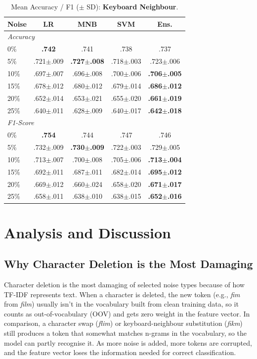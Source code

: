 \documentclass[sigconf]{acmart}
\begin{document}
\begin{table}
  \centering
  \caption{Mean Accuracy / F1 ($\pm$ SD): \textbf{Keyboard Neighbour}.}
  \label{tab:kbn}
  \small
  \begin{tabular}{lcccc}
    \toprule
    \textbf{Noise} & \textbf{LR} & \textbf{MNB} & \textbf{SVM} & \textbf{Ens.} \\
    \midrule
    \multicolumn{5}{l}{\textit{Accuracy}} \\
    0\%  & \textbf{.742} & .741 & .738 & .737 \\
    5\%  & .721$\pm$.009 & \textbf{.727$\pm$.008} & .718$\pm$.003 & .723$\pm$.006 \\
    10\% & .697$\pm$.007 & .696$\pm$.008 & .700$\pm$.006 & \textbf{.706$\pm$.005} \\
    15\% & .678$\pm$.012 & .680$\pm$.012 & .679$\pm$.014 & \textbf{.686$\pm$.012} \\
    20\% & .652$\pm$.014 & .653$\pm$.021 & .655$\pm$.020 & \textbf{.661$\pm$.019} \\
    25\% & .640$\pm$.011 & .628$\pm$.009 & .640$\pm$.017 & \textbf{.642$\pm$.018} \\
    \midrule
    \multicolumn{5}{l}{\textit{F1-Score}} \\
    0\%  & \textbf{.754} & .744 & .747 & .746 \\
    5\%  & .732$\pm$.009 & \textbf{.730$\pm$.009} & .722$\pm$.003 & .729$\pm$.005 \\
    10\% & .713$\pm$.007 & .700$\pm$.008 & .705$\pm$.006 & \textbf{.713$\pm$.004} \\
    15\% & .692$\pm$.011 & .687$\pm$.011 & .682$\pm$.014 & \textbf{.695$\pm$.012} \\
    20\% & .669$\pm$.012 & .660$\pm$.024 & .658$\pm$.020 & \textbf{.671$\pm$.017} \\
    25\% & .658$\pm$.011 & .638$\pm$.010 & .638$\pm$.015 & \textbf{.652$\pm$.016} \\
    \bottomrule
  \end{tabular}
\end{table}


\section{Analysis and Discussion}

\subsection{Why Character Deletion is the Most Damaging}
Character deletion is the most damaging of selected noise types because of how
TF-IDF represents text. When a character is deleted, the new token (e.g.,
\textit{fim} from \textit{film}) usually isn't in the vocabulary built from
clean training data, so it counts as out-of-vocabulary (OOV) and gets zero
weight in the feature vector. In comparison, a character swap (\textit{flim})
or keyboard-neighbour substitution (\textit{fikm}) still produces a token that
somewhat matches n-grams in the vocabulary, so the model can partly recognise
it. As more noise is added, more tokens are corrupted, and the feature vector
loses the information needed for correct classification.
\end{document}
